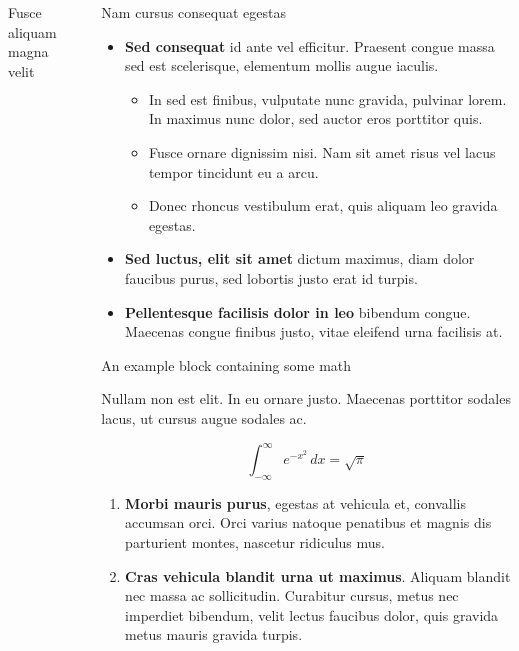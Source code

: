 \documentclass[final]{beamer}
\newlength{\sepwidth}
\newlength{\colwidth}
\newcommand{\separatorcolumn}{\begin{column}{\sepwidth}\end{column}}
\begin{document}
\begin{frame}[t]
\begin{columns}[t]
\begin{column}{\colwidth}
\begin{block}{Fusce aliquam magna velit}
			\end{block}

		\end{column}

		\separatorcolumn

		\begin{column}{\colwidth}

			\begin{block}{Nam cursus consequat egestas}

				\begin{itemize}
					\item \textbf{Sed consequat} id ante vel efficitur. Praesent congue massa
					      sed est scelerisque, elementum mollis augue iaculis.
					      \begin{itemize}
						      \item In sed est finibus, vulputate
						            nunc gravida, pulvinar lorem. In maximus nunc dolor, sed auctor eros
						            porttitor quis.
						      \item Fusce ornare dignissim nisi. Nam sit amet risus vel lacus
						            tempor tincidunt eu a arcu.
						      \item Donec rhoncus vestibulum erat, quis aliquam leo
						            gravida egestas.
					      \end{itemize}
					\item \textbf{Sed luctus, elit sit amet} dictum maximus, diam dolor
					      faucibus purus, sed lobortis justo erat id turpis.
					\item \textbf{Pellentesque facilisis dolor in leo} bibendum congue.
					      Maecenas congue finibus justo, vitae eleifend urna facilisis at.
				\end{itemize}

			\end{block}

			\begin{exampleblock}{An example block containing some math}{}

				Nullam non est elit. In eu ornare justo. Maecenas porttitor sodales lacus,
				ut cursus augue sodales ac.

				$$
					\int_{-\infty}^{\infty} e^{-x^2}\,dx = \sqrt{\pi}
				$$

				\begin{enumerate}
					\item \textbf{Morbi mauris purus}, egestas at vehicula et, convallis
					      accumsan orci. Orci varius natoque penatibus et magnis dis parturient
					      montes, nascetur ridiculus mus.
					\item \textbf{Cras vehicula blandit urna ut maximus}. Aliquam blandit nec
					      massa ac sollicitudin. Curabitur cursus, metus nec imperdiet bibendum,
					      velit lectus faucibus dolor, quis gravida metus mauris gravida turpis.
				\end{enumerate}


\end{exampleblock}
\end{column}
\end{columns}
\end{frame}
\end{document}

